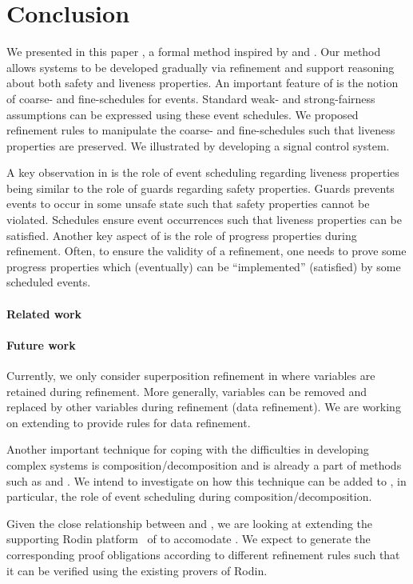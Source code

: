 \section{Conclusion}
\label{sec:conclusion}

We presented in this paper \unitb, a formal method inspired by \eventB
and \unity.  Our method allows systems to be developed gradually via
refinement and support reasoning about both safety and liveness
properties.  An important feature of \unitb is the notion of coarse-
and fine-schedules for events.  Standard weak- and strong-fairness
assumptions can be expressed using these event schedules.  We
proposed refinement rules to manipulate the coarse-
and fine-schedules such that liveness properties are
preserved.  We illustrated \unitb by developing a signal control
system.

A key observation in \unitb is the role of event scheduling regarding
liveness properties being similar to the role of guards regarding safety
properties.  Guards prevents events to occur in some unsafe state such
that safety properties cannot be violated.  Schedules ensure event
occurrences such that liveness properties can be satisfied.  Another
key aspect of \unitb is the role of progress properties during
refinement.  Often, to ensure the validity of a refinement, one needs
to prove some progress properties which (eventually) can be
``implemented'' (satisfied) by some scheduled events.

\paragraph{Related work}


\paragraph{Future work}

Currently, we only consider superposition refinement in \unitb where
variables are retained during refinement.  More generally, variables
can be removed and replaced by other variables during refinement (data
refinement). We are working on extending \unitb to provide rules for data
refinement.

Another important technique for coping with the difficulties in
developing complex systems is composition/decomposition and is already
a part of methods such as \eventB and \unity.  We intend to investigate
on how this technique can be added to \unitb, in particular, the role
of event scheduling during composition/decomposition.

Given the close relationship between \unitb and \eventB, we are
looking at extending the supporting Rodin
platform~\cite{abrial10:_rodin} of \eventB to accomodate \unitb.  We
expect to generate the corresponding proof obligations according to
different refinement rules such that it can be verified using the
existing provers of Rodin.


